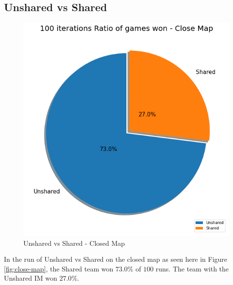 \documentclass[]{report}
\begin{document}
		\subsection{Unshared vs Shared}
		\begin{figure}[h!]
			\centering
			\includegraphics[width=0.9\linewidth]{"Images/100 Games Unshared vs Shared Close Map"}
			\caption[Unshared vs Shared - Closed Map]{Unshared vs Shared - Closed Map}
			\label{fig:100-games-unshared-vs-shared-close-map}
		\end{figure}
	In the run of Unshared vs Shared on the closed map as seen here in Figure \ref{fig:close-map}, the Shared team won $73.0\%$ of $100$ runs. The team with the Unshared \ac{IM} won $27.0\%$.
		
		\clearpage
\end{document}

